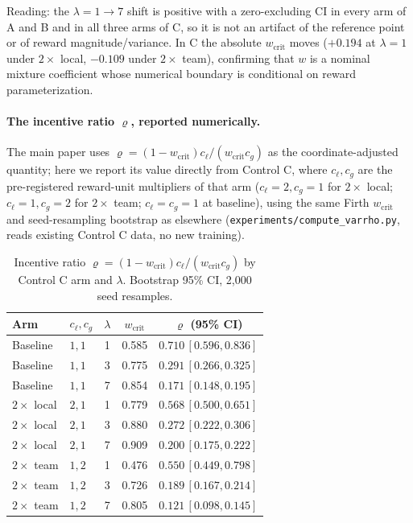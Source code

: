 \documentclass[letterpaper]{article} %
\theoremstyle{plain}
\newcommand{\wcrit}{w_{\mathrm{crit}}}
\begin{document}
Reading: the $\lambda{=}1{\to}7$ shift is positive with a zero-excluding CI in every arm of A and B
and in all three arms of C, so it is not an artifact of the reference point or of reward
magnitude/variance. In C the absolute $\wcrit$ moves ($+0.194$ at $\lambda{=}1$ under $2\times$ local,
$-0.109$ under $2\times$ team), confirming that $w$ is a nominal mixture coefficient whose numerical
boundary is conditional on reward parameterization.

\paragraph{The incentive ratio $\varrho$, reported numerically.} The main paper uses
$\varrho=(1-\wcrit)c_\ell/(\wcrit c_g)$ as the coordinate-adjusted quantity; here we report its
value directly from Control C, where $c_\ell,c_g$ are the pre-registered
reward-unit multipliers of that arm ($c_\ell{=}2,c_g{=}1$ for $2\times$ local; $c_\ell{=}1,c_g{=}2$ for
$2\times$ team; $c_\ell{=}c_g{=}1$ at baseline), using the same Firth $\wcrit$ and seed-resampling
bootstrap as elsewhere (\texttt{experiments/compute\_varrho.py}, reads existing Control C data, no new
training).

\begin{table}[t]\centering\small
\caption{Incentive ratio $\varrho=(1-\wcrit)c_\ell/(\wcrit c_g)$ by Control C arm and $\lambda$.
Bootstrap 95\% CI, 2{,}000 seed resamples.}
\label{tab:s_varrho}
\begin{tabular}{llccc}
\toprule
Arm & $c_\ell,c_g$ & $\lambda$ & $\wcrit$ & $\varrho$ (95\% CI) \\
\midrule
Baseline    & $1,1$ & 1 & 0.585 & $0.710\,[0.596,0.836]$ \\
Baseline    & $1,1$ & 3 & 0.775 & $0.291\,[0.266,0.325]$ \\
Baseline    & $1,1$ & 7 & 0.854 & $0.171\,[0.148,0.195]$ \\
$2\times$ local & $2,1$ & 1 & 0.779 & $0.568\,[0.500,0.651]$ \\
$2\times$ local & $2,1$ & 3 & 0.880 & $0.272\,[0.222,0.306]$ \\
$2\times$ local & $2,1$ & 7 & 0.909 & $0.200\,[0.175,0.222]$ \\
$2\times$ team  & $1,2$ & 1 & 0.476 & $0.550\,[0.449,0.798]$ \\
$2\times$ team  & $1,2$ & 3 & 0.726 & $0.189\,[0.167,0.214]$ \\
$2\times$ team  & $1,2$ & 7 & 0.805 & $0.121\,[0.098,0.145]$ \\
\bottomrule
\end{tabular}
\end{table}
\end{document}
